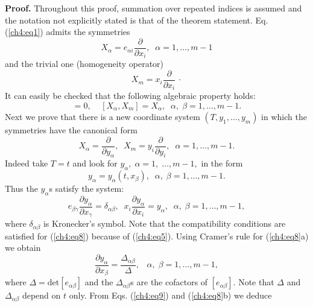 {\bf Proof.} Throughout this proof, summation over repeated 
indices is assumed and the notation not explicitly stated is 
that of the theorem statement.
Eq. (\ref{ch4:eq1}) admits the symmetries
\begin{equation}
X_{\alpha}=e_{\alpha i}\frac{\partial}{\partial x_i},\;\;  
\alpha=1,\ldots,m-1
\label{ch4:eq3}
\end{equation}
and the trivial one (homogeneity operator)
\begin{equation}
X_m=x_i\frac{\partial}{\partial x_i}\, \cdot \label{ch4:eq4}
\end{equation}
It can easily be checked that the following algebraic property holds: 
\begin{equation}
[X_{\alpha}, X_{\beta}]=0,\;\;\;\;[X_{\alpha},X_m]=X_{\alpha}, \label{ch4:eq5}
\;\; \alpha,\;\beta=1,\ldots,m-1.
\end{equation}
Next we prove that there is  a new coordinate system $(T,y_1,\ldots ,y_m)$
in which the symmetries have the canonical form
\begin{equation}
X_{\alpha}=\frac{\partial}{\partial y_{\alpha}},\;\;
X_m=y_i\frac{\partial}{\partial y_i},\;\;\alpha=1,\ldots,m-1.
 \label{ch4:eq6}
\end{equation}
Indeed take $T=t$ and look for $y_{\alpha},\;\alpha=1,\;\ldots,m-1,$ in
the form
\begin{equation}
y_{\alpha}=y_{\alpha}(t,x_{\beta}),\;\; \alpha,\;\beta=1,\ldots,m-1. 
\label{ch4:eq7}
\end{equation}
Thus the $y_{\alpha}$s satisfy the system:
\begin{equation}
e_{\beta \gamma}\frac{\partial y_{\alpha}}{\partial x_{\gamma}}=
\delta_{\alpha \beta},\;\; 
x_i\frac{\partial y_{\alpha}}{\partial x_i}=y_{\alpha}, \label{ch4:eq8}
\;\;\alpha,\;\beta=1,\ldots,m-1,
\end{equation}
where $\delta_{\alpha \beta}$ is Kronecker's symbol. 
Note that the compatibility
conditions are satisfied for (\ref{ch4:eq8}) because of (\ref{ch4:eq5}).
Using Cramer's rule for (\ref{ch4:eq8}a) we obtain
\begin{equation}
\frac{\partial y_{\alpha}}{\partial x_{\beta}}=
\frac{\Delta_{\alpha \beta }}{\Delta}, 
\;\;\; \alpha,\;\beta=1,\ldots,m-1, \label{ch4:eq9}
\end{equation}
where $\Delta=\mbox{det}[e_{\alpha \beta}]$ and the $\Delta_{\alpha \beta}$s 
are the cofactors of $[e_{\alpha \beta}]$. Note that $\Delta$ and
$\Delta_{\alpha\beta }$ depend on $t$ only. From Eqs. (\ref{ch4:eq9}) and 
(\ref{ch4:eq8}b) we deduce
